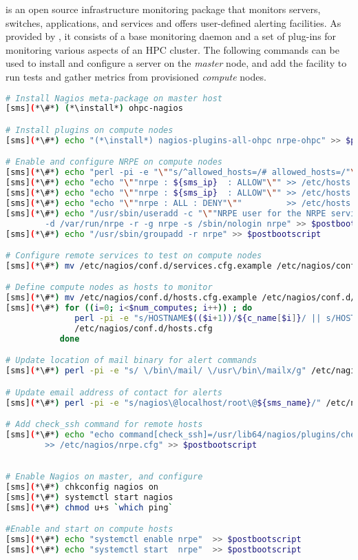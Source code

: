 \Nagios{} is an open source infrastructure monitoring package that monitors
servers, switches, applications, and services and offers user-defined alerting
facilities. As provided by \OHPC{}, it consists of a base monitoring daemon and
a set of plug-ins for monitoring various aspects of an HPC cluster. The
following commands can be used to install and configure a \Nagios{} server on the {\em
master} node, and add the facility to run tests and gather metrics from
provisioned {\em compute} nodes.

\begin{lstlisting}[language=bash,keywords={},upquote=true]
# Install Nagios meta-package on master host
[sms](*\#*) (*\install*) ohpc-nagios

# Install plugins on compute nodes
[sms](*\#*) echo "(*\install*) nagios-plugins-all-ohpc nrpe-ohpc" >> $postbootscript

# Enable and configure NRPE on compute nodes
[sms](*\#*) echo "perl -pi -e "\""s/^allowed_hosts=/# allowed_hosts=/"\"" /etc/nagios/nrpe.cfg" >> $postbootscript
[sms](*\#*) echo "echo "\""nrpe : ${sms_ip}  : ALLOW"\"" >> /etc/hosts.allow" >> $postbootscript
[sms](*\#*) echo "echo "\""nrpe : ${sms_ip}  : ALLOW"\"" >> /etc/hosts.allow" >> $postbootscript
[sms](*\#*) echo "echo "\""nrpe : ALL : DENY"\""         >> /etc/hosts.allow" >> $postbootscript
[sms](*\#*) echo "/usr/sbin/useradd -c "\""NRPE user for the NRPE service"\"" \
        -d /var/run/nrpe -r -g nrpe -s /sbin/nologin nrpe" >> $postbootscript
[sms](*\#*) echo "/usr/sbin/groupadd -r nrpe" >> $postbootscript

# Configure remote services to test on compute nodes
[sms](*\#*) mv /etc/nagios/conf.d/services.cfg.example /etc/nagios/conf.d/services.cfg

# Define compute nodes as hosts to monitor
[sms](*\#*) mv /etc/nagios/conf.d/hosts.cfg.example /etc/nagios/conf.d/hosts.cfg
[sms](*\#*) for ((i=0; i<$num_computes; i++)) ; do
              perl -pi -e "s/HOSTNAME$(($i+1))/${c_name[$i]}/ || s/HOST$(($i+1))_IP/${c_ip[$i]}/" \
              /etc/nagios/conf.d/hosts.cfg
           done

# Update location of mail binary for alert commands
[sms](*\#*) perl -pi -e "s/ \/bin\/mail/ \/usr\/bin\/mailx/g" /etc/nagios/objects/commands.cfg

# Update email address of contact for alerts
[sms](*\#*) perl -pi -e "s/nagios\@localhost/root\@${sms_name}/" /etc/nagios/objects/contacts.cfg

# Add check_ssh command for remote hosts
[sms](*\#*) echo "echo command[check_ssh]=/usr/lib64/nagios/plugins/check_ssh localhost \
        >> /etc/nagios/nrpe.cfg" >> $postbootscript
        

# Enable Nagios on master, and configure
[sms](*\#*) chkconfig nagios on
[sms](*\#*) systemctl start nagios
[sms](*\#*) chmod u+s `which ping`

#Enable and start on compute hosts
[sms](*\#*) echo "systemctl enable nrpe"  >> $postbootscript
[sms](*\#*) echo "systemctl start  nrpe"  >> $postbootscript
\end{lstlisting}

